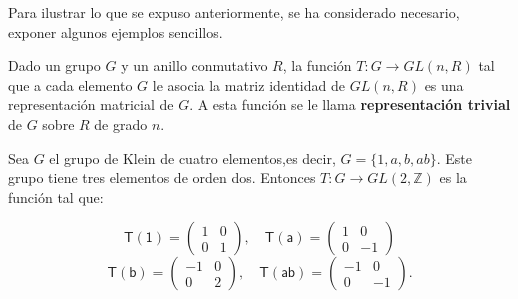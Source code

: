 Para ilustrar lo que se expuso anteriormente, se ha considerado necesario, exponer algunos ejemplos sencillos.

\begin{ejemplo}
Dado un grupo $G$ y un anillo conmutativo $R$, la función $T \colon G \to GL(n,R)$ tal que a cada elemento $G$ le asocia la matriz identidad de $GL(n,R)$ es una representación matricial de $G$. A esta función  se le llama \textbf{representación trivial} de $G$ sobre $R$ de grado $n$. 
\end{ejemplo}


\begin{ejemplo}
Sea $G$ el grupo de Klein de cuatro elementos,es decir, $G = \{ 1, a, b, ab\}$. Este grupo tiene tres elementos de orden dos. Entonces $T \colon G \to GL(2, \mathds{Z})$ es la función tal que:

\begin{equation*} \mathsf{T(1)} = \begin{pmatrix}
1 & 0 \\
0 & 1
\end{pmatrix}, \quad \mathsf{T(a)} = \begin{pmatrix}
1 & 0 \\
0 & -1
\end{pmatrix} \end{equation*}
\begin{equation*} \mathsf{T(b)} = \begin{pmatrix}
-1 & 0 \\
0 & 2
\end{pmatrix}, \quad \mathsf{T(ab)} = \begin{pmatrix}
-1 & 0 \\
0 & -1
\end{pmatrix}. \end{equation*}
\end{ejemplo}

